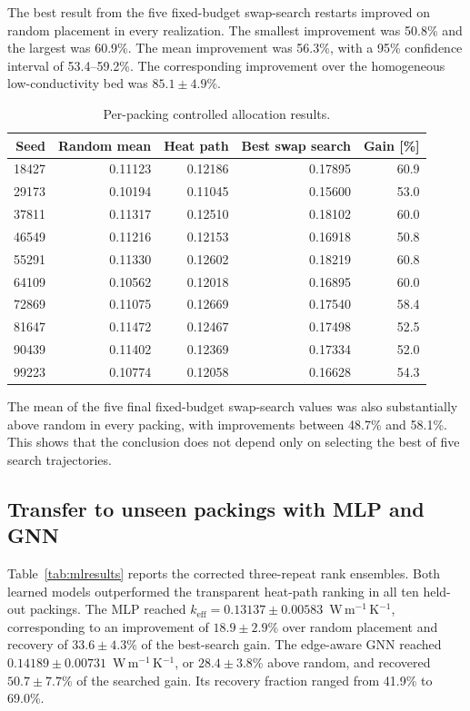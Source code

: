 \documentclass[12pt,a4paper]{article}
\begin{document}
	The best result from the five fixed-budget swap-search restarts improved on
	random placement in every realization.
	The smallest improvement was 50.8\% and the largest was 60.9\%. The mean
	improvement was 56.3\%, with a 95\% confidence interval of 53.4--59.2\%.
	The corresponding improvement over the homogeneous low-conductivity bed was
	$85.1\pm4.9$\%.
	
	\begin{table}[!htbp]
		\centering
		\caption{Per-packing controlled allocation results.}
		\label{tab:cases}
		\small
		\begin{tabular}{rrrrr}
			\toprule
			\textbf{Seed} & \textbf{Random mean} & \textbf{Heat path} &
			\textbf{Best swap search} & \textbf{Gain [\%]} \\
			\midrule
			18427 & 0.11123 & 0.12186 & 0.17895 & 60.9 \\
			29173 & 0.10194 & 0.11045 & 0.15600 & 53.0 \\
			37811 & 0.11317 & 0.12510 & 0.18102 & 60.0 \\
			46549 & 0.11216 & 0.12153 & 0.16918 & 50.8 \\
			55291 & 0.11330 & 0.12602 & 0.18219 & 60.8 \\
			64109 & 0.10562 & 0.12018 & 0.16895 & 60.0 \\
			72869 & 0.11075 & 0.12669 & 0.17540 & 58.4 \\
			81647 & 0.11472 & 0.12467 & 0.17498 & 52.5 \\
			90439 & 0.11402 & 0.12369 & 0.17334 & 52.0 \\
			99223 & 0.10774 & 0.12058 & 0.16628 & 54.3 \\
			\bottomrule
		\end{tabular}
	\end{table}
	
	The mean of the five final fixed-budget swap-search values was also substantially above
	random in every packing, with improvements between 48.7\% and 58.1\%. This
	shows that the conclusion does not depend only on selecting the best of five
	search trajectories.

	\subsection{Transfer to unseen packings with MLP and GNN}

	Table~\ref{tab:mlresults} reports the corrected three-repeat rank ensembles.
	Both learned models outperformed the transparent heat-path ranking in all ten
	held-out packings. The MLP reached
	$k_{\mathrm{eff}}=0.13137\pm0.00583$~W\,m$^{-1}$\,K$^{-1}$, corresponding to
	an improvement of $18.9\pm2.9$\% over random placement and recovery of
	$33.6\pm4.3$\% of the best-search gain. The edge-aware GNN reached
	$0.14189\pm0.00731$~W\,m$^{-1}$\,K$^{-1}$, or $28.4\pm3.8$\% above random, and
	recovered $50.7\pm7.7$\% of the searched gain. Its recovery fraction ranged
	from 41.9\% to 69.0\%.
\end{document}
